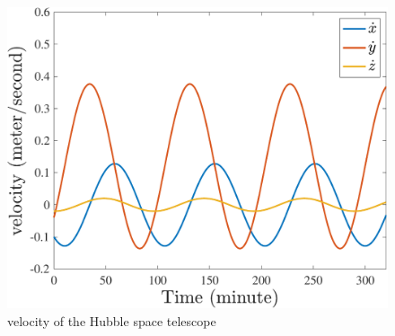 \begin{figure}[H]
    \caption{velocity of the Hubble space telescope}
    \centering
    \includegraphics[width=12cm]{../Figure/Q1/velocity}
\end{figure}





